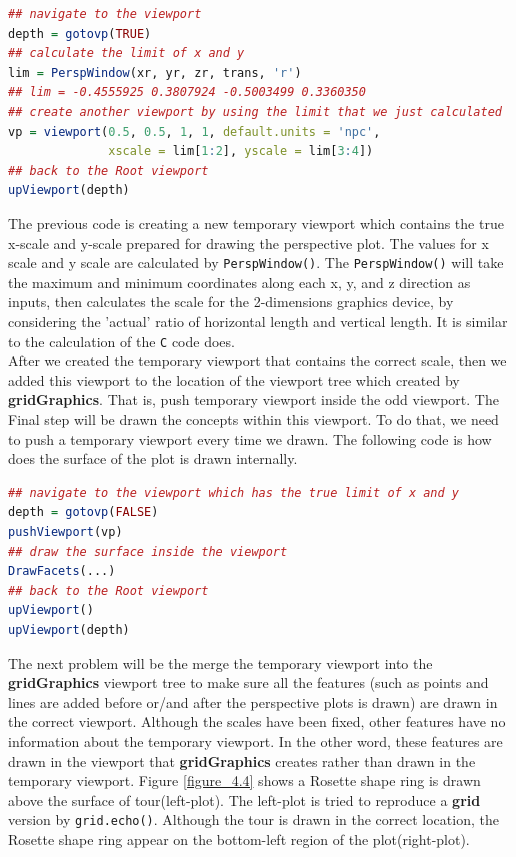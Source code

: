 \documentclass[11pt,twoside]{report}
\begin{document}
\newpage
\begin{lstlisting}[language = R]
## navigate to the viewport
depth = gotovp(TRUE) 
## calculate the limit of x and y
lim = PerspWindow(xr, yr, zr, trans, 'r')
## lim = -0.4555925 0.3807924 -0.5003499 0.3360350
## create another viewport by using the limit that we just calculated
vp = viewport(0.5, 0.5, 1, 1, default.units = 'npc',
              xscale = lim[1:2], yscale = lim[3:4]) 
## back to the Root viewport
upViewport(depth)  
\end{lstlisting}
The previous code is creating a new temporary viewport which contains the true x-scale and y-scale prepared for drawing the perspective plot. The values for x scale and y scale are calculated by \texttt{PerspWindow()}. The \texttt{PerspWindow()} will take the maximum and minimum coordinates along each x, y, and z direction as inputs, then calculates the scale for the 2-dimensions graphics device, by considering the 'actual' ratio of horizontal length and vertical length. It is similar to the calculation of the \texttt{C} code does.\\

After we created the temporary viewport that contains the correct scale, then we added this viewport to the location of the viewport tree which created by \textbf{gridGraphics}. That is, push temporary viewport inside the odd viewport. The Final step will be drawn the concepts within this viewport. To do that, we need to push a temporary viewport every time we drawn. The following code is how does the surface of the plot is drawn internally.

\begin{lstlisting}[language = R]
## navigate to the viewport which has the true limit of x and y
depth = gotovp(FALSE)
pushViewport(vp)
## draw the surface inside the viewport
DrawFacets(...)
## back to the Root viewport
upViewport()
upViewport(depth)
\end{lstlisting}

The next problem will be the merge the temporary viewport into the \textbf{gridGraphics} viewport tree to make sure all the features (such as points and lines are added before or/and after the perspective plots is drawn) are drawn in the correct viewport. Although the scales have been fixed, other features have no information about the temporary viewport. In the other word, these features are drawn in the viewport that \textbf{gridGraphics} creates rather than drawn in the temporary viewport. Figure \ref{figure_4.4} shows a Rosette shape ring is drawn above the surface of tour(left-plot). The left-plot is tried to reproduce a \textbf{grid} version by \texttt{grid.echo()}. Although the tour is drawn in the correct location, the Rosette shape ring appear on the bottom-left region of the plot(right-plot). \\
\end{document}
